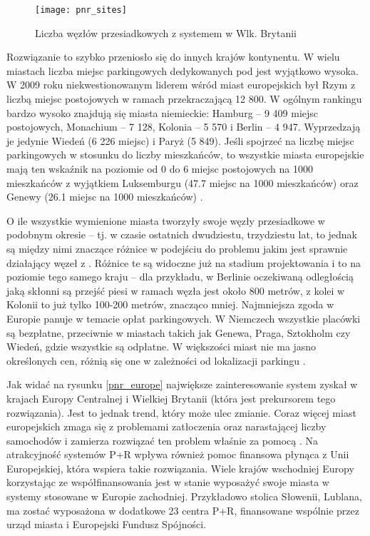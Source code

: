 \documentclass[twoside,12pt]{article}
\begin{document}
	\begin{figure}[H]
		\centering
		\texttt{[image: pnr\_sites]}\\
		\caption{Liczba węzłów przesiadkowych z systemem \pnr{} w Wlk. Brytanii}
		\label{pnr_sites}
	\end{figure}
	
	Rozwiązanie to szybko przeniosło się do innych krajów kontynentu. W wielu miastach liczba miejsc parkingowych dedykowanych pod \pnr{} jest wyjątkowo wysoka. W 2009 roku niekwestionowanym liderem wśród miast europejskich był Rzym z liczbą miejsc postojowych w ramach \pnr{} przekraczającą 12 800. W ogólnym rankingu bardzo wysoko znajdują się miasta niemieckie: Hamburg -- 9 409 miejsc postojowych, Monachium -- 7 128, Kolonia -- 5 570 i Berlin -- 4 947. Wyprzedzają je jedynie Wiedeń (6 226 miejsc) i Paryż (5 849). Jeśli spojrzeć na liczbę miejsc parkingowych w stosunku do liczby mieszkańców, to wszystkie miasta europejskie mają ten wskaźnik na poziomie od 0 do 6 miejsc postojowych na 1000 mieszkańców z wyjątkiem Luksemburgu (47.7 miejsc na 1000 mieszkańców) oraz Genewy (26.1 miejsc na 1000 mieszkańców) \cite{eurotest}.
	
	O ile wszystkie wymienione miasta tworzyły swoje węzły przesiadkowe w podobnym okresie -- tj. w czasie ostatnich dwudziestu, trzydziestu lat, to jednak są między nimi znaczące różnice w podejściu do problemu jakim jest sprawnie działający węzeł z \pnr{}. Różnice te są widoczne już na stadium projektowania i to na poziomie tego samego kraju -- dla przykładu, w Berlinie oczekiwaną odległością jaką skłonni są przejść piesi w ramach węzła jest około 800 metrów, z kolei w Kolonii to już tylko 100-200 metrów, znacząco mniej. Najmniejsza zgoda w Europie panuje w temacie opłat parkingowych. W Niemczech wszystkie placówki \pnr{} są bezpłatne, przeciwnie w miastach takich jak Genewa, Praga, Sztokholm czy Wiedeń, gdzie wszystkie są odpłatne. W większości miast nie ma jasno określonych cen, różnią się one w zależności od lokalizacji parkingu \cite{eurotest}.
	
	Jak widać na rysunku \ref{pnr_europe} największe zainteresowanie system \pnr{} zyskał w krajach Europy Centralnej i Wielkiej Brytanii (która jest prekursorem tego rozwiązania). Jest to jednak trend, który może ulec zmianie. Coraz więcej miast europejskich zmaga się z problemami zatłoczenia oraz narastającej liczby samochodów i zamierza rozwiązać ten problem właśnie za pomocą \pnr{}. Na atrakcyjność systemów P+R wpływa również pomoc finansowa płynąca z Unii Europejskiej, która wspiera takie rozwiązania. Wiele krajów wschodniej Europy korzystając ze współfinansowania jest w stanie wyposażyć swoje miasta w systemy stosowane w Europie zachodniej. Przykładowo stolica Słowenii, Lublana, ma zostać wyposażona w dodatkowe 23 centra P+R, finansowane wspólnie przez urząd miasta i Europejski Fundusz Spójności. 
	
\end{document}
